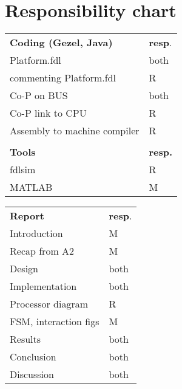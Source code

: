 \section*{Responsibility chart}
\renewcommand{\arraystretch}{1}
\begin{multicols}{2}


\begin{table}[H]
    \begin{tabular}{ll}
    \textbf{Coding (Gezel, Java)}  & \textbf{resp}. \\
    Platform.fdl   & both  \\
    commenting Platform.fdl & R \\
    Co-P on BUS    & both \\
    Co-P link to CPU & R \\
    Assembly to machine compiler & R \\ 
        & \\
    \textbf{Tools}  & \textbf{resp.} \\
    fdlsim          & R  \\
    MATLAB          & M
    \end{tabular}
\end{table}

\begin{table}[H]
    \begin{tabular}{ll}
    \textbf{Report}  & \textbf{resp}. \\
    Introduction    & M \\
    Recap from A2   & M \\
    Design          & both  \\
    Implementation  & both  \\
    Processor diagram   & R \\
    FSM, interaction figs & M \\
    Results         & both  \\
    Conclusion      & both  \\
    Discussion      & both  \\
    \end{tabular}
\end{table}


\end{multicols}
\renewcommand{\arraystretch}{1}